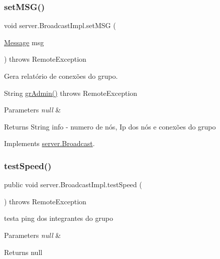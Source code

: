 \subsubsection{\texorpdfstring{set\+M\+S\+G()}{setMSG()}}
{\footnotesize\ttfamily void server.\+Broadcast\+Impl.\+set\+M\+SG (\begin{DoxyParamCaption}\item[{\hyperlink{classstructure_1_1_message}{Message}}]{msg }\end{DoxyParamCaption}) throws Remote\+Exception}



Gera relatório de conexões do grupo. 

String \hyperlink{classserver_1_1_broadcast_impl_ae5995f5346d95cdbcd02361f10158671}{gr\+Admin()} throws Remote\+Exception 
\begin{DoxyParams}{Parameters}
{\em null} & \\
\hline
\end{DoxyParams}
\begin{DoxyReturn}{Returns}
String info -\/ numero de nós, Ip dos nós e conexões do grupo 
\end{DoxyReturn}


Implements \hyperlink{interfaceserver_1_1_broadcast_a96f8dad32733e1d5e503435c11e324af}{server.\+Broadcast}.

\mbox{\label{classserver_1_1_broadcast_impl_a1ddfea5e6826ec8ff3e6aa3a3a525ccb}} 
\subsubsection{\texorpdfstring{test\+Speed()}{testSpeed()}}
{\footnotesize\ttfamily public void server.\+Broadcast\+Impl.\+test\+Speed (\begin{DoxyParamCaption}{ }\end{DoxyParamCaption}) throws Remote\+Exception}



testa ping dos integrantes do grupo 


\begin{DoxyParams}{Parameters}
{\em null} & \\
\hline
\end{DoxyParams}
\begin{DoxyReturn}{Returns}
null 
\end{DoxyReturn}


